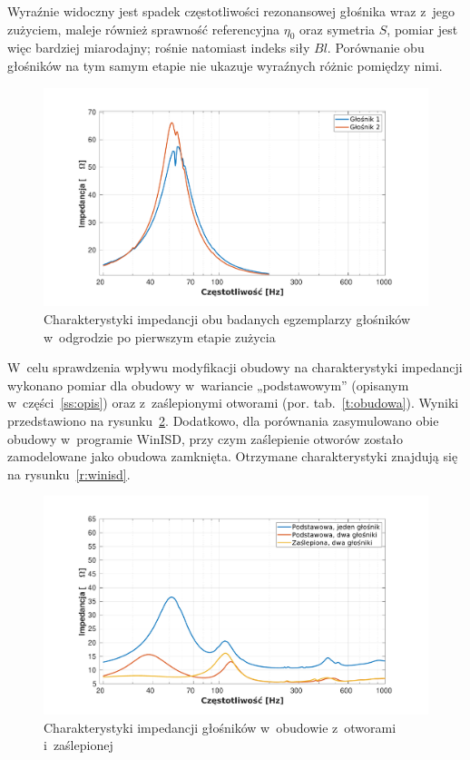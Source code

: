 \documentclass[12pt]{oska}
\begin{document}
	Wyraźnie widoczny jest spadek częstotliwości rezonansowej głośnika wraz z~jego zużyciem, maleje również sprawność referencyjna $\eta_0$ oraz symetria $S$, pomiar jest więc bardziej miarodajny; rośnie natomiast indeks siły $Bl$. Porównanie obu głośników na tym samym etapie nie ukazuje wyraźnych różnic pomiędzy nimi.
	
	\begin{figure}[!ht]
	\centering
	\includegraphics[width=.8\textwidth,trim={2cm .5cm 2cm 1cm},clip]{porownanie_glosnikow.pdf}
	\caption{Charakterystyki impedancji obu badanych egzemplarzy głośników w~odgrodzie po pierwszym etapie zużycia}
	\label{r:2glosniki}
	\end{figure}
	
	W~celu sprawdzenia wpływu modyfikacji obudowy na charakterystyki impedancji wykonano pomiar dla obudowy w~wariancie „podstawowym” (opisanym w~części~\ref{ss:opis}) oraz z~zaślepionymi otworami (por. tab.~\ref{t:obudowa}). Wyniki przedstawiono na rysunku~\ref{r:obudowa_otwory}. 
	Dodatkowo, dla porównania zasymulowano obie obudowy w~programie WinISD, przy czym zaślepienie otworów zostało zamodelowane jako obudowa zamknięta. Otrzymane charakterystyki znajdują się na rysunku~\ref{r:winisd}.
	
	\begin{figure}[!ht]
		\centering
		\includegraphics[width=.8\textwidth,trim={2cm .5cm 2cm 1cm},clip]{obudowa_otwory.pdf}
		\caption{Charakterystyki impedancji głośników w~obudowie z~otworami i~zaślepionej}
		\label{r:obudowa_otwory}
	\end{figure}
	
\end{document}
